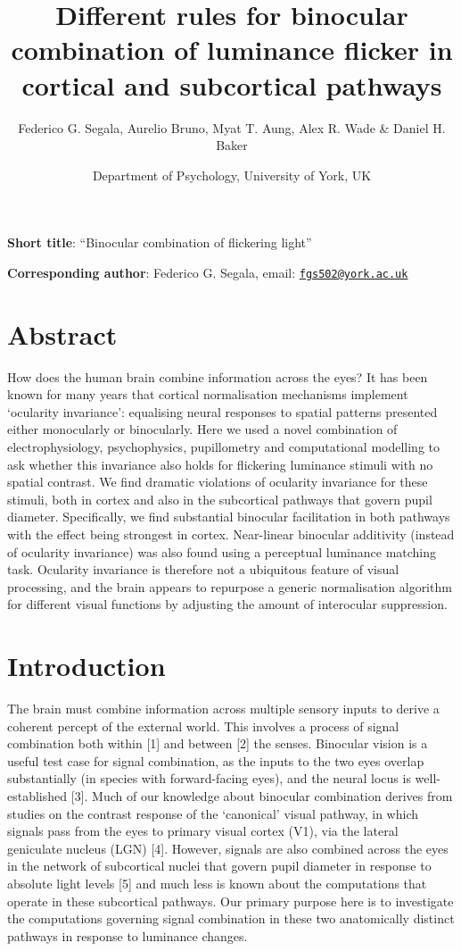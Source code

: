 \documentclass[
]{article}
\title{Different rules for binocular combination of luminance flicker in cortical and subcortical pathways}
\author{Federico G. Segala, Aurelio Bruno, Myat T. Aung, Alex R. Wade \& Daniel H. Baker}
\date{Department of Psychology, University of York, UK}
\begin{document}
\maketitle

\textbf{Short title}: ``Binocular combination of flickering light''

\textbf{Corresponding author}: Federico G. Segala, email: \href{mailto:fgs502@york.ac.uk}{\nolinkurl{fgs502@york.ac.uk}}
\newpage

\hypertarget{abstract}{%
\section{Abstract}\label{abstract}}

How does the human brain combine information across the eyes? It has been known for many years that cortical normalisation mechanisms implement `ocularity invariance': equalising neural responses to spatial patterns presented either monocularly or binocularly. Here we used a novel combination of electrophysiology, psychophysics, pupillometry and computational modelling to ask whether this invariance also holds for flickering luminance stimuli with no spatial contrast. We find dramatic violations of ocularity invariance for these stimuli, both in cortex and also in the subcortical pathways that govern pupil diameter. Specifically, we find substantial binocular facilitation in both pathways with the effect being strongest in cortex. Near-linear binocular additivity (instead of ocularity invariance) was also found using a perceptual luminance matching task. Ocularity invariance is therefore not a ubiquitous feature of visual processing, and the brain appears to repurpose a generic normalisation algorithm for different visual functions by adjusting the amount of interocular suppression.

\hypertarget{introduction}{%
\section{Introduction}\label{introduction}}

The brain must combine information across multiple sensory inputs to derive a coherent percept of the external world. This involves a process of signal combination both within {[}1{]} and between {[}2{]} the senses. Binocular vision is a useful test case for signal combination, as the inputs to the two eyes overlap substantially (in species with forward-facing eyes), and the neural locus is well-established {[}3{]}. Much of our knowledge about binocular combination derives from studies on the contrast response of the `canonical' visual pathway, in which signals pass from the eyes to primary visual cortex (V1), via the lateral geniculate nucleus (LGN) {[}4{]}. However, signals are also combined across the eyes in the network of subcortical nuclei that govern pupil diameter in response to absolute light levels {[}5{]} and much less is known about the computations that operate in these subcortical pathways. Our primary purpose here is to investigate the computations governing signal combination in these two anatomically distinct pathways in response to luminance changes.
\end{document}
